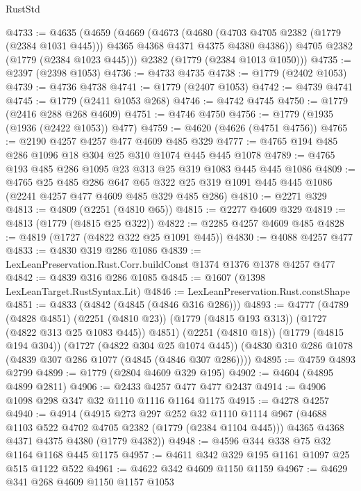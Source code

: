 \begin{lexlean}{RustStd}
\begin{coremodule}
@4733 := @4635
    (@4659
      (@4669
        (@4673
          (@4680
            (@4703 @4705 @2382 (@1779 (@2384 @1031 @445)))
            @4365
            @4368
            @4371
            @4375
            @4380
            @4386))
        @4705
        @2382
        (@1779 (@2384 @1023 @445)))
      @2382
      (@1779 (@2384 @1013 @1050)))
@4735 := @2397 (@2398 @1053)
@4736 := @4733 @4735
@4738 := @1779 (@2402 @1053)
@4739 := @4736 @4738
@4741 := @1779 (@2407 @1053)
@4742 := @4739 @4741
@4745 := @1779 (@2411 @1053 @268)
@4746 := @4742 @4745
@4750 := @1779 (@2416 @288 @268 @4609)
@4751 := @4746 @4750
@4756 := @1779 (@1935 (@1936 (@2422 @1053)) @477)
@4759 := @4620 (@4626 (@4751 @4756))
@4765 := @2190 @4257 @4257 @477 @4609 @485 @329
@4777 := @4765 @194 @485 @286 @1096 @18 @304 @25 @310 @1074 @445 @445 @1078
@4789 := @4765 @193 @485 @286 @1095 @23 @313 @25 @319 @1083 @445 @445 @1086
@4809 := @4765
    @25
    @485
    @286
    @647
    @65
    @322
    @25
    @319
    @1091
    @445
    @445
    @1086
    (@2241 @4257 @477 @4609 @485 @329 @485 @286)
@4810 := @2271 @329
@4813 := @4809 (@2251 (@4810 @65))
@4815 := @2277 @4609 @329
@4819 := @4813 (@1779 (@4815 @25 @322))
@4822 := @2285 @4257 @4609 @485
@4828 := @4819 (@1727 (@4822 @322 @25 @1091 @445))
@4830 := @4088 @4257 @477
@4833 := @4830 @319 @286 @1086
@4839 := LexLeanPreservation.Rust.Corr.buildConst @1374 @1376 @1378 @4257 @477
@4842 := @4839 @316 @286 @1085
@4845 := @1607 (@1398 LexLeanTarget.RustSyntax.Lit)
@4846 := LexLeanPreservation.Rust.constShape
@4851 := @4833 (@4842 (@4845 (@4846 @316 @286)))
@4893 := @4777
    (@4789
      (@4828 @4851)
      (@2251 (@4810 @23))
      (@1779 (@4815 @193 @313))
      (@1727 (@4822 @313 @25 @1083 @445))
      @4851)
    (@2251 (@4810 @18))
    (@1779 (@4815 @194 @304))
    (@1727 (@4822 @304 @25 @1074 @445))
    (@4830 @310 @286 @1078 (@4839 @307 @286 @1077 (@4845 (@4846 @307 @286))))
@4895 := @4759 @4893 @2799
@4899 := @1779 (@2804 @4609 @329 @195)
@4902 := @4604 (@4895 @4899 @2811)
@4906 := @2433 @4257 @477 @477 @2437
@4914 := @4906 @1098 @298 @347 @32 @1110 @1116 @1164 @1175
@4915 := @4278 @4257
@4940 := @4914
    (@4915
      @273
      @297
      @252
      @32
      @1110
      @1114
      @967
      (@4688 @1103 @522 @4702 @4705 @2382 (@1779 (@2384 @1104 @445)))
      @4365
      @4368
      @4371
      @4375
      @4380
      (@1779 @4382))
@4948 := @4596 @344 @338 @75 @32 @1164 @1168 @445 @1175
@4957 := @4611 @342 @329 @195 @1161 @1097 @25 @515 @1122 @522
@4961 := @4622 @342 @4609 @1150 @1159
@4967 := @4629 @341 @268 @4609 @1150 @1157 @1053

\end{coremodule}
\end{lexlean}
